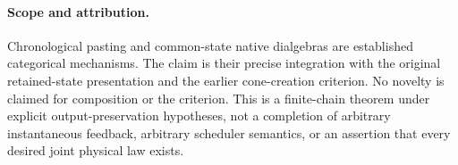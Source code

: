 \documentclass{article}
\begin{document}
\paragraph{Scope and attribution.} Chronological pasting and common-state native dialgebras are established categorical mechanisms. The claim is their precise integration with the original retained-state presentation and the earlier cone-creation criterion. No novelty is claimed for composition or the criterion. This is a finite-chain theorem under explicit output-preservation hypotheses, not a completion of arbitrary instantaneous feedback, arbitrary scheduler semantics, or an assertion that every desired joint physical law exists.
\end{document}
